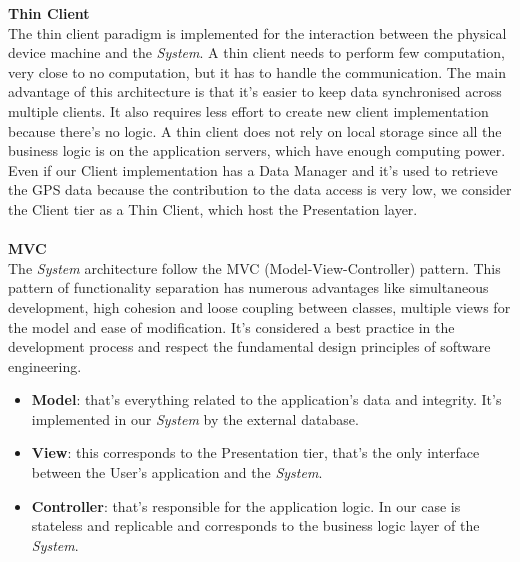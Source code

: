 \documentclass{article}
\begin{document}
	{\bf Thin Client} \\
	The thin client paradigm is implemented for the interaction between the physical device machine and the {\it System}. A thin client needs to perform few computation, very close to no computation, but it has to handle the communication. The main advantage of this architecture is that it’s easier to keep data synchronised across multiple clients. It also requires less effort to create new client implementation because there's no logic. A thin client does not rely on local storage since all the business logic is on the application servers, which have enough computing power. Even if our Client implementation has a Data Manager and it's used to retrieve the GPS data because the contribution to the data access is very low, we consider the Client tier as a Thin Client, which host the Presentation layer.
	\\ \\
	{\bf MVC} \\
	The {\it System} architecture follow the MVC (Model-View-Controller) pattern. This pattern of functionality separation has numerous advantages like simultaneous development, high cohesion and loose coupling between classes, multiple views for the model and ease of modification. It's considered a best practice in the development process and respect the fundamental design principles of software engineering.
	\begin{itemize}
		\item {\bf Model}: that's everything related to the application's data and integrity. It's implemented in our {\it System} by the external database.
		\item {\bf View}: this corresponds to the Presentation tier, that's the only interface between the User's application and the {\it System}.
		\item {\bf Controller}: that's responsible for the application logic. In our case is stateless and replicable and corresponds to the business logic layer of the {\it System}.
	\end{itemize}
		
\end{document}
